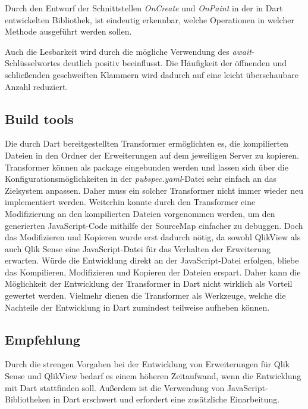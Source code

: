 Durch den Entwurf der Schnittstellen \textit{OnCreate} und \textit{OnPaint} in der in Dart entwickelten Bibliothek, ist eindeutig erkennbar, welche Operationen in welcher Methode ausgeführt werden sollen.

Auch die Lesbar\-keit wird durch die mögliche Verwendung des \textit{await}-Schlüsselwortes deutlich positiv beeinflusst. Die Häufig\-keit der öffnenden und schließenden geschweiften Klammern wird dadurch auf eine leicht überschaubare Anzahl reduziert.

\subsection{Build tools}

Die durch Dart bereitgestellten Transformer ermöglichten es, die kompilierten Dateien in den Ordner der Erweiterungen auf dem jeweiligen Server zu kopieren. Transformer können als package eingebunden werden und lassen sich über die Konfigurations\-möglich\-keiten in der \textit{pubspec.yaml}-Datei sehr einfach an das Zielsystem anpassen. Daher muss ein solcher Transformer nicht immer wieder neu implementiert werden. Weiterhin konnte durch den Transformer eine Modifizierung an den kompilierten Dateien vorgenommen werden, um den generierten JavaScript-Code mithilfe der SourceMap einfacher zu debuggen. Doch das Modifizieren und Kopieren wurde erst dadurch nötig, da sowohl QlikView als auch Qlik Sense eine JavaScript-Datei für das Verhalten der Erweiterung erwarten. Würde die Entwicklung direkt an der JavaScript-Datei erfolgen, bliebe das Kompilieren, Modifizieren und Kopieren der Dateien erspart. Daher kann die Möglich\-keit der Entwicklung der Transformer in Dart nicht wirklich als Vorteil gewertet werden. Vielmehr dienen die Transformer als Werkzeuge, welche die Nachteile der Entwicklung in Dart zumindest teilweise aufheben können.

\newpage

\subsection{Empfehlung}


Durch die strengen Vorgaben bei der Entwicklung von Erweiterungen für Qlik Sense und QlikView bedarf es einem höheren Zeitaufwand, wenn die Entwicklung mit Dart stattfinden soll. Außerdem ist die Verwendung von JavaScript-Bibliotheken in Dart erschwert und erfordert eine zusätzliche Einarbeitung.

